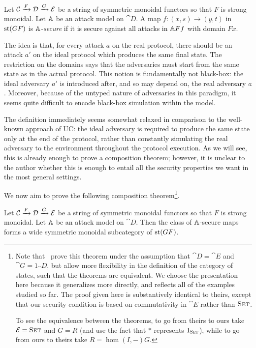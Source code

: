 \begin{dfn}
  Let $\cat{C}\xto{F}\cat{D}\xto{G}\cat{E}$ be a string of
  symmetric monoidal functors so that $F$ is strong monoidal. Let $\AA$ be an
  attack model on $\cat{D}$. A map $f: (x, s)\to (y, t)$ in $\state{GF}$ is
  $\AA$-\emph{secure} if it is secure against all attacks in $\AA Ff$ with
  domain $Fx$.
\end{dfn}

The idea is that, for every attack $a$ on the real protocol, there should be an
attack $a'$ on the ideal protocol which produces the same final state. The
restriction on the domains says that the adversaries must start from the same
state as in the actual protocol. This notion is fundamentally not black-box: the
ideal adversary $a'$ is introduced after, and so may depend on, the real
adversary $a$. Moreover, because of the untyped nature of adversaries in this
paradigm, it seems quite difficult to encode black-box simulation within the
model.

The definition immediately seems somewhat relaxed in comparison to the well-known
approach of UC: the ideal adversary is required to produce the same state only
at the end of the protocol, rather than constantly simulating the real adversary
to the environment throughout the protocol execution. As we will see, this is
already enough to prove a composition theorem; however, it is unclear to the
author whether this is enough to entail all the security properties we want in
the most general settings.

We now aim to prove the following composition theorem\footnote{
  Note that~\cite{broadbent-karvonen-2022} prove this theorem under the
  assumption that $\cat{D} = \cat{E}$ and $\cat{G} = 1_\cat{D}$, but allow more
  flexibility in the definition of the category of states, such that the
  theorems are equivalent. We choose the presentation here because it
  generalizes more directly, and reflects all of the examples studied so far.
  The proof given here is substantively identical to theirs, except that our
  security condition is based on commutativity in $\cat{E}$ rather than
  $\scat{Set}$.

  To see the equivalence between the theorems, to go from theirs to ours take
  $\cat{E} = \scat{Set}$ and $G = R$ (and use the fact that $*$ represents
  $1_\scat{Set}$), while to go from ours to theirs take $R = \hom(I, -)G$.
}.

\begin{thm}\label{ccc:composition}
  Let $\cat{C}\xto{F}\cat{D}\xto{G}\cat{E}$ be a string of symmetric monoidal
  functors so that $F$ is strong monoidal. Let $\AA$ be an attack model on
  $\cat{D}$. Then the class of $\AA$-secure maps forms a wide symmetric monoidal
  subcategory of $\state{GF}$.
\end{thm}

